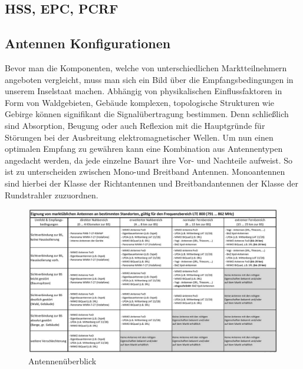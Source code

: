	\subsection{HSS, EPC, PCRF}
	\label{subsec:Antennen HSS, EPC, PCRF}
	
	\subsection{Antennen Konfigurationen}
	\label{subsec:Antennen Konfigurationen}
Bevor man die Komponenten, welche von unterschiedlichen Marktteilnehmern angeboten vergleicht, muss man sich ein Bild über die Empfangsbedingungen in unserem Inselstaat machen. Abhängig von physikalischen Einflussfaktoren in Form von Waldgebieten, Gebäude komplexen, topologische Strukturen wie Gebirge können signifikant die Signalübertragung bestimmen. Denn schließlich sind Absorption, Beugung oder auch Reflexion mit die Hauptgründe für Störungen bei der Ausbreitung elektromagnetischer Wellen. Um nun einen optimalen Empfang zu gewähren kann eine Kombination aus Antennentypen angedacht werden, da jede einzelne Bauart ihre Vor- und Nachteile aufweist. So ist zu unterscheiden zwischen Mono-und Breitband Antennen. Monoantennen sind hierbei der Klasse der Richtantennen und Breitbandantennen der Klasse der Rundstrahler zuzuordnen. \cite{Sch19}
\begin{figure}[H]
	\centering
	\includegraphics[width=1\linewidth]{images/tabellemcnantennen}
	\caption{Antennenüberblick  \protect\cite{Sch19}}
	\label{fig:tabellemcnantennen}
\end{figure}
\raggedbottom 
